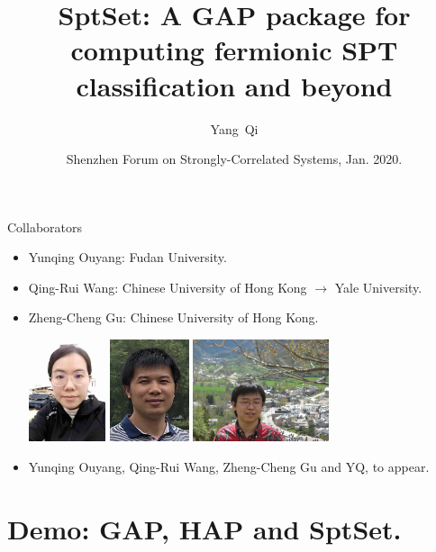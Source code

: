 \documentclass[xcolor=table, aspectratio=169]{beamer}
\title[Intro to SptSet] %
{SptSet: A GAP package for computing fermionic SPT classification and beyond}
\author[Y Qi] %
{Yang~Qi}
\institute[Fudan] %
{Department of Physics, Fudan University}
\date{Shenzhen Forum on Strongly-Correlated Systems, Jan. 2020.}
\begin{document}
\begin{frame}
  \titlepage
\end{frame}

\begin{frame}{Collaborators}
\begin{itemize}
\item Yunqing Ouyang: Fudan University.
\item Qing-Rui Wang: Chinese University of Hong Kong $\rightarrow$ Yale University.
\item Zheng-Cheng Gu: Chinese University of Hong Kong.
\begin{center}
	\includegraphics[height=3cm]{../people/yunqing}
	\includegraphics[height=3cm]{../people/qingrui}
	\includegraphics[height=3cm]{../people/zhengcheng}
\end{center}
\item Yunqing Ouyang, Qing-Rui Wang, Zheng-Cheng Gu and YQ, to appear.
\end{itemize}
\end{frame}

\section{Demo: GAP, HAP and SptSet.}
\end{document}

